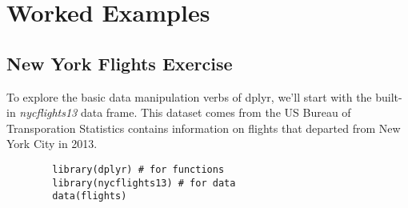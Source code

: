 	\newpage
	\section{Worked Examples}
	
	\subsection{New York Flights Exercise}
	
	To explore the basic data manipulation verbs of dplyr, we'll start with the built-in \textit{nycflights13} data frame. This dataset comes from the US Bureau of Transporation Statistics contains information on flights that departed from New York City in 2013. 
	
	
	\begin{framed}
		\begin{verbatim}
		library(dplyr) # for functions
		library(nycflights13) # for data
		data(flights)
		\end{verbatim}
	\end{framed}
	
